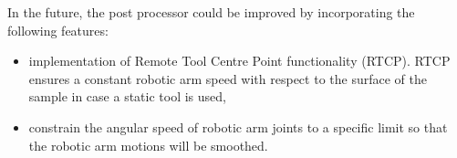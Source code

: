 In the future, the post processor could be improved by incorporating the following features:

\begin{itemize}

    \item implementation of Remote Tool Centre Point functionality (RTCP). RTCP ensures a constant robotic arm speed with respect to the surface of the sample in case a static tool is used,

    \item constrain the angular speed of robotic arm joints to a specific limit so that the robotic arm motions will be smoothed.

\end{itemize}


